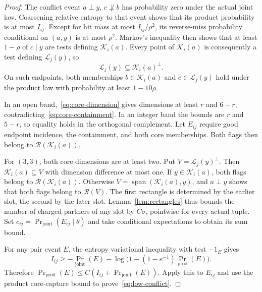 \begin{proof}
The conflict event $a\perp y$, $c\not\perp b$ has probability zero
under the actual joint law.  Coarsening relative entropy to that event
shows that its product probability is at most $I_{ij}$.
Except for hit mass at most $I_{ij}/\rho^2$, its reverse-miss probability
conditional on $(a,y)$ is at most $\rho^2$.
Markov's inequality then shows that at least $1-\rho$ of $c\mid y$
are tests defining $\mathcal K_i(a)$.  Every point of $\mathcal K_i(a)$
is consequently a test defining $\mathcal L_j(y)$, so
\begin{equation}\label{eq:core-containment}
 \mathcal L_j(y)\subseteq\mathcal K_i(a)^\perp.
\end{equation}
On such endpoints, both memberships
$b\in\mathcal K_i(a)$ and $c\in\mathcal L_j(y)$ hold under the product
law with probability at least $1-10\rho$.

In an open band,~\eqref{eq:core-dimension} gives dimensions at least
$r$ and $6-r$, contradicting~\eqref{eq:core-containment}.
In an integer band the bounds are $r$ and $5-r$, so equality holds in
the orthogonal complement.  Let $E_{ij}$ require good endpoint incidence,
the containment, and both core memberships.  Both flags then belong to
$\mathcal R(\mathcal K_i(a))$.

For $(3,3)$, both core dimensions are at least two.  Put
$V=\mathcal L_j(y)^\perp$.  Then
$\mathcal K_i(a)\subseteq V$ with dimension difference at most one.
If $y\in\mathcal K_i(a)$, both flags belong to
$\mathcal R(\mathcal K_i(a))$.  Otherwise
$V=\operatorname{span}(\mathcal K_i(a),y)$, and $a\perp y$ shows that
both flags belong to $\mathcal R(V)$.
The first rectangle is determined by the earlier slot, the second by
the later slot.  Lemma~\ref{lem:rectangles} thus bounds the number of
charged partners of any slot by $C\sigma$, pointwise for every actual
tuple.  Set $c_{ij}=\Pr_{\mathrm{joint}}(E_{ij}\mid\theta)$ and take
conditional expectations to obtain its sum bound.

For any pair event $E$, the entropy variational inequality with test
$-1_E$ gives
\[
 I_{ij}\ge-\Pr_{\mathrm{joint}}(E)
   -\log\bigl(1-(1-e^{-1})\Pr_{\mathrm{prod}}(E)\bigr).
\]
Therefore $\Pr_{\mathrm{prod}}(E)\le
C(I_{ij}+\Pr_{\mathrm{joint}}(E))$.  Apply this to $E_{ij}$ and use
the product core-capture bound to prove~\eqref{eq:low-conflict}.
\end{proof}

